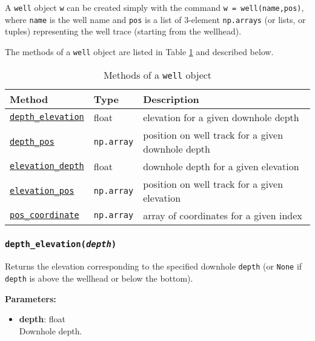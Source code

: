 A \texttt{well} object \texttt{w} can be created simply with the command \texttt{w = well(name,pos)}, where \texttt{name} is the well name and \texttt{pos} is a list of 3-element \texttt{np.arrays} (or lists, or tuples) representing the well trace (starting from the wellhead).

The methods of a \texttt{well} object are listed in Table \ref{tb:well_methods} and described below.

\begin{table}
  \begin{center}
    \begin{tabular}{|l|l|l|}
      \hline
      \textbf{Method} & \textbf{Type} & \textbf{Description}\\
      \hline
      \hyperref[sec:well:depth_elevation]{\texttt{depth\_elevation}} & float & elevation for a given downhole depth \\
      \hyperref[sec:well:depth_pos]{\texttt{depth\_pos}} & \texttt{np.array} & position on well track for a given downhole depth \\
      \hyperref[sec:well:elevation_depth]{\texttt{elevation\_depth}} & float & downhole depth for a given elevation \\
      \hyperref[sec:well:elevation_pos]{\texttt{elevation\_pos}} & \texttt{np.array} & position on well track for a given elevation \\
      \hyperref[sec:well:pos_coordinate]{\texttt{pos\_coordinate}} & \texttt{np.array} & array of coordinates for a given index \\
      \hline
    \end{tabular}
    \caption{Methods of a \texttt{well} object}
    \label{tb:well_methods}
  \end{center}
\end{table}

\begin{snugshade}
\subsubsection{\texttt{depth\_elevation(\emph{depth})}}
\end{snugshade}
\label{sec:well:depth_elevation}

Returns the elevation corresponding to the specified downhole \texttt{depth} (or \texttt{None} if \texttt{depth} is above the wellhead or below the bottom).

\textbf{Parameters:}
\begin{itemize}
\item \textbf{depth}: float\\
  Downhole depth.
\end{itemize}

